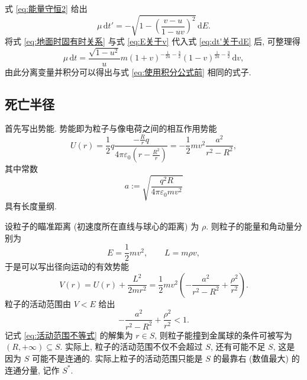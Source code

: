 \documentclass{article}
\begin{document}
式 \ref{eq:能量守恒2} 给出
\begin{equation}
	\label{eq:dt'关于dE}
	\mu\,\mathrm dt'=-\sqrt{1-\left(\frac{v-u}{1-uv}\right)^2}\,\mathrm dE.
\end{equation}
将式 \ref{eq:地面时固有时关系} 与式 \ref{eq:E关于v} 代入式 \ref{eq:dt'关于dE} 后, 可整理得
\begin{equation}
	\mu\,\mathrm dt=\frac{\sqrt{1-u^2}}um\left(1+v\right)^{-\frac1{2u}-\frac32}
	\left(1-v\right)^{\frac1{2u}-\frac32}\,\mathrm dv,
\end{equation}
由此分离变量并积分可以得出与式 \ref{eq:使用积分公式前} 相同的式子.

\subsection{死亡半径}

首先写出势能.
势能即为粒子与像电荷之间的相互作用势能
\begin{equation}
	U\!\left(r\right)=\frac12q\frac{-\frac Rrq}
	{4\pi\varepsilon_0\left(r-\frac{R^2}r\right)}
	=-\frac12mv^2\frac{a^2}{r^2-R^2},
\end{equation}
其中常数
\begin{equation}
	a:=\sqrt{\frac{q^2R}{4\pi\varepsilon_0mv^2}}
\end{equation}
具有长度量纲.

设粒子的瞄准距离 (初速度所在直线与球心的距离) 为 $\rho$.
则粒子的能量和角动量分别为
\begin{equation}
	E=\frac12mv^2,\qquad L=m\rho v,
\end{equation}
于是可以写出径向运动的有效势能
\begin{equation}
	V\!\left(r\right)=U\!\left(r\right)+\frac{L^2}{2mr^2}
	=\frac12mv^2\left(-\frac{a^2}{r^2-R^2}+\frac{\rho^2}{r^2}\right).
\end{equation}
粒子的活动范围由 $V<E$ 给出
\begin{equation}
	\label{eq:活动范围不等式}
	-\frac{a^2}{r^2-R^2}+\frac{\rho^2}{r^2}<1.
\end{equation}
记式 \ref{eq:活动范围不等式} 的解集为 $r\in S$, 则粒子能撞到金属球的条件可被写为
$\left(R,+\infty\right)\subseteq S$.
实际上, 粒子的活动范围不仅不会超过 $S$, 还有可能不足 $S$,
这是因为 $S$ 可能不是连通的.
实际上粒子的活动范围只能是 $S$ 的最靠右 (数值最大) 的连通分量, 记作 $S^*$.
\end{document}
